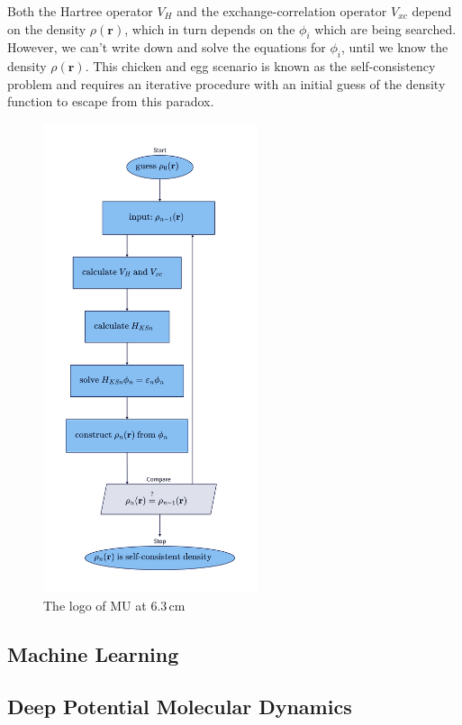 Both the Hartree operator $V_H$ and the exchange-correlation operator $V_{xc}$
depend on the density $\rho(\mathbf{r})$, which in turn depends on the
$\phi_i$ which are being searched. However, we can't write down and solve the
equations for $\phi_i$, until we know the density $\rho(\mathbf{r})$. This
chicken and egg scenario is known as the self-consistency problem and requires
an iterative procedure with an initial guess of the density function to escape
from this paradox.

\begin{figure}
  \begin{center}
    \includegraphics[width=6.3cm]{image/self_consistency}
  \end{center}
  \caption{The logo of \acrlong{MU} at 6.3\,cm}
  \label{fig:mulogo1}
\end{figure}

\subsection{Machine Learning}

\subsection{Deep Potential Molecular Dynamics}

